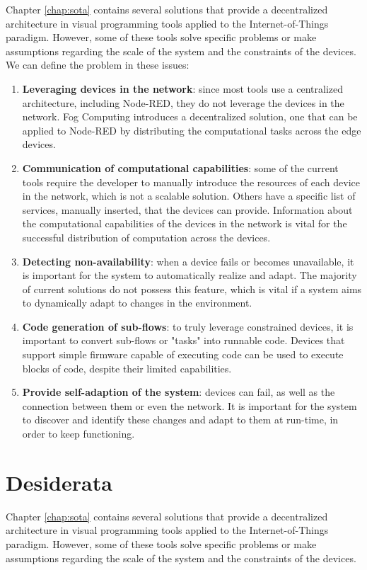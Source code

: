 Chapter \ref{chap:sota} contains several solutions that provide a decentralized architecture in visual programming tools applied to the Internet-of-Things paradigm. However, some of these tools solve specific problems or make assumptions regarding the scale of the system and the constraints of the devices.
We can define the problem in these issues:
\begin{enumerate}
    \item \textbf{Leveraging devices in the network}: since most tools use a centralized architecture, including Node-RED, they do not leverage the devices in the network. Fog Computing introduces a decentralized solution, one that can be applied to Node-RED by distributing the computational tasks across the edge devices.
    \item \textbf{Communication of computational capabilities}: some of the current tools require the developer to manually introduce the resources of each device in the network, which is not a scalable solution. Others have a specific list of services, manually inserted, that the devices can provide. Information about the computational capabilities of the devices in the network is vital for the successful distribution of computation across the devices.
    \item \textbf{Detecting non-availability}: when a device fails or becomes unavailable, it is important for the system to automatically realize and adapt. The majority of current solutions do not possess this feature, which is vital if a system aims to dynamically adapt to changes in the environment.
    \item \textbf{Code generation of sub-flows}: to truly leverage constrained devices, it is important to convert sub-flows or "tasks" into runnable code. Devices that support simple firmware capable of executing code can be used to execute blocks of code, despite their limited capabilities.
    \item \textbf{Provide self-adaption of the system}: devices can fail, as well as the connection between them or even the network. It is important for the system to discover and identify these changes and adapt to them at run-time, in order to keep functioning.
\end{enumerate}

\section{Desiderata}\label{sec:desiderata}
Chapter \ref{chap:sota} contains several solutions that provide a decentralized architecture in visual programming tools applied to the Internet-of-Things paradigm. However, some of these tools solve specific problems or make assumptions regarding the scale of the system and the constraints of the devices.

